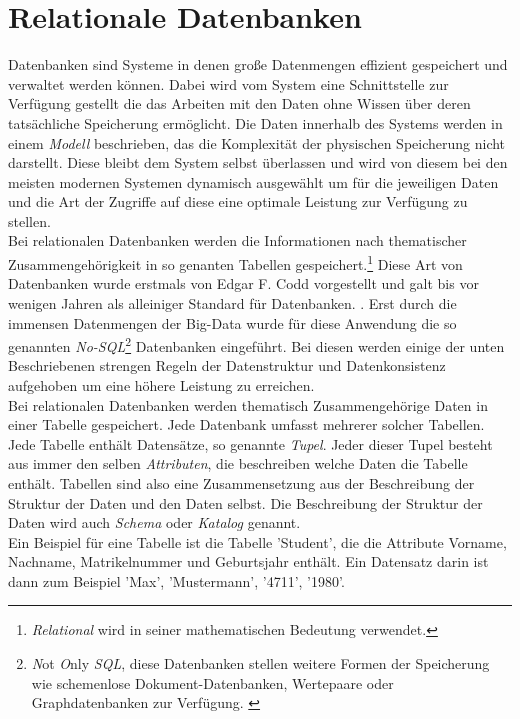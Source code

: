 \section{Relationale Datenbanken}
Datenbanken sind Systeme in denen große Datenmengen effizient gespeichert und verwaltet werden können. Dabei wird vom System eine Schnittstelle zur Verfügung gestellt die das Arbeiten mit den Daten ohne Wissen über deren tatsächliche Speicherung ermöglicht. Die Daten innerhalb des Systems werden in einem \emph{Modell} beschrieben, das die Komplexität der physischen Speicherung nicht darstellt. Diese bleibt dem System selbst überlassen und wird von diesem bei den meisten modernen Systemen dynamisch ausgewählt um für die jeweiligen Daten und die Art der Zugriffe auf diese eine optimale Leistung zur Verfügung zu stellen.
\\Bei relationalen Datenbanken werden die Informationen nach thematischer Zusammengehörigkeit in so genanten Tabellen gespeichert.\footnote{\emph{Relational} wird in seiner mathematischen Bedeutung verwendet.} Diese Art von Datenbanken wurde erstmals von Edgar F. Codd vorgestellt und galt bis vor wenigen Jahren als alleiniger Standard für Datenbanken. \parencite[S. 133]{dbgrund}. Erst durch die immensen Datenmengen der Big-Data wurde für diese Anwendung die so genannten \emph{No-SQL}\footnote{\emph{N}ot \emph{O}nly \emph{SQL}, diese Datenbanken stellen weitere Formen der Speicherung wie schemenlose Dokument-Datenbanken, Wertepaare oder Graphdatenbanken zur Verfügung. \parencite[S. 11ff]{Fasel2016} } Datenbanken eingeführt. Bei diesen werden einige der unten Beschriebenen strengen Regeln der Datenstruktur und Datenkonsistenz aufgehoben um eine höhere Leistung zu erreichen.
\\Bei relationalen Datenbanken werden thematisch Zusammengehörige Daten in einer Tabelle gespeichert. Jede Datenbank umfasst mehrerer solcher Tabellen. Jede Tabelle enthält Datensätze, so genannte \emph{Tupel}. Jeder dieser Tupel besteht aus immer den selben \emph{Attributen}, die beschreiben welche Daten die Tabelle enthält. Tabellen sind also eine Zusammensetzung aus der Beschreibung der Struktur der Daten und den Daten selbst. Die Beschreibung der Struktur der Daten wird auch \emph{Schema} oder \emph{Katalog} genannt.
\\Ein Beispiel für eine Tabelle ist die Tabelle 'Student', die die Attribute Vorname, Nachname, Matrikelnummer und Geburtsjahr enthält. Ein Datensatz darin ist dann zum Beispiel 'Max', 'Mustermann', '4711', '1980'.\parencite[S. 137]{dbgrund} \parencite{DBLP:journals/cacm/Codd70}
